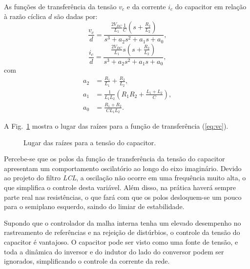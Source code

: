     As funções de transferência da tensão $v_c$ e da corrente $i_c$ do capacitor em relação à razão cíclica $d$ são dadas por:
    \begin{equation}
        \frac{v_c}{d} = \frac{\frac{2V_{DC}}{L_1} \frac{1}{C}
        	\left( s + \frac{R_2}{L_2} \right)}{s^3 + a_2 s^2 + a_1 s + a_0} \text{,}
        \label{eq:vc}
    \end{equation}
    \begin{equation}
        \frac{i_c}{d} = \frac{\frac{2V_{DC}}{L_1} s
        	\left( s + \frac{R_2}{L_2} \right)}{s^3 + a_2 s^2 + a_1 s + a_0} \text{,}
        \label{eq:ic}
    \end{equation}
    com
    \begin{equation}
    	\begin{split}
	        a_2 & = \frac{R_1}{L_1} + \frac{R_2}{L_2} \text{,} \\
	        a_1 & = \frac{1}{L_1 L_2} \left( R_1 R_2
	        	+ \frac{L_1 + L_2}{C} \right) \text{,} \\
	        a_0 & = \frac{R_1 + R_2}{C L_1 L_2} \text{.}
	    \end{split}
    \end{equation}

    A Fig.~\ref{fig:rlocus_vc} mostra o lugar das raízes para a função de transferência (\ref{eq:vc}).

    \begin{figure}[htb]
        \centering{
           }
        \renewcommand\figurename{Fig.}
        \caption{Lugar das raízes para a tensão do capacitor.}
        \label{fig:rlocus_vc}
    \end{figure}

    Percebe-se que os polos da função de transferência da tensão do capacitor apresentam um comportamento oscilatório ao longo do eixo imaginário. Devido ao projeto do filtro \emph{LCL}, a oscilação não ocorre em uma frequência muito alta, o que simplifica o controle desta variável. Além disso, na prática haverá sempre parte real nas resistências, o que fará com que os polos desloquem-se um pouco para o semiplano esquerdo, saindo do limiar de estabilidade.

    Supondo que o controlador da malha interna tenha um elevado desempenho no rastreamento de referências e na rejeição de distúrbios, o controle da tensão do capacitor é vantajoso. O capacitor pode ser visto como uma fonte de tensão, e toda a dinâmica do inversor e do indutor do lado do conversor podem ser ignorados, simplificando o controle da corrente da rede.

